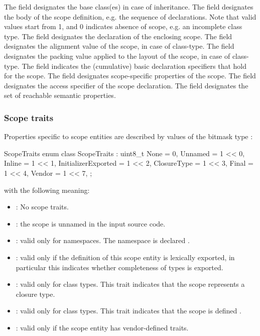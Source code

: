 \noindent
The  field designates the base class(es) in case of inheritance.
The  field designates the body of the scope definition, e.g. the sequence of declarations.  
Note that valid  values start from 1, and 0 indicates absence of scope, e.g. an incomplete class type.
The  field designates the declaration of the enclosing scope.
The  field designates the alignment value of the scope, in case of class-type.
The  field designates the packing value applied to the layout of the scope, in case of class-type.
The  field indicates the (cumulative) basic declaration specifiers that hold for the scope.
The  field designates scope-specific properties of the scope.
The  field designates the access specifier of the scope declaration.
The  field designates the set of reachable semantic properties.


\subsubsection{Scope traits}
\label{sec:ifc-scope-traits}

Properties specific to scope entities are described by values of the bitmask type :
%
\begin{typedef}{ScopeTraits}{}
	enum class ScopeTraits : uint8_t {
		None			= 0,
		Unnamed		= 1 << 0,
		Inline			= 1 << 1,
		InitializerExported	= 1 << 2,
		ClosureType	= 1 << 3,
		Final = 1 << 4,
		Vendor			= 1 << 7,
	};
\end{typedef}
%
with the following meaning:
\begin{itemize}
  \item {}: No scope traits.
  \item {}: the scope is unnamed in the input source code.
  \item {}: valid only for namespaces.  The namespace is declared .
  \item {}: valid only if the definition of this scope entity is lexically exported, in particular this indicates whether completeness of types is exported.
  \item {}: valid only for class types.  This trait indicates that the scope represents a closure type.
  \item {}: valid only for class types. This trait indicates that the scope is defined .
  \item {}: valid only if the scope entity has vendor-defined traits.
\end{itemize}

